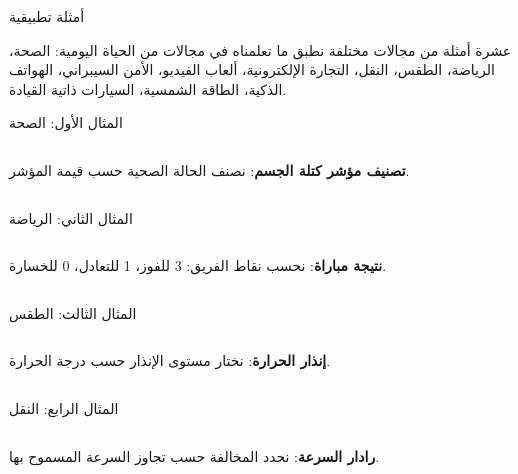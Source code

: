 \begin{frame}{أمثلة تطبيقية}
    \begin{tbox}{\faLaptopCode\quad عشرة أمثلة من مجالات مختلفة}
        نطبق ما تعلمناه في مجالات من الحياة اليومية:
        الصحة، الرياضة، الطقس، النقل، التجارة الإلكترونية، ألعاب الفيديو، الأمن السيبراني، الهواتف الذكية، الطاقة الشمسية، السيارات ذاتية القيادة.
    \end{tbox}
\end{frame}

\begin{frame}[t]{المثال الأول: الصحة}
    \begin{columns}[T]
        {\small\textbf{تصنيف مؤشر كتلة الجسم}: نصنف الحالة الصحية حسب قيمة المؤشر.\par}
        \vspace{0.3cm}
    \end{columns}
\end{frame}

\begin{frame}[t]{المثال الثاني: الرياضة}
    \begin{columns}[T]
        {\small\textbf{نتيجة مباراة}: نحسب نقاط الفريق: 3 للفوز، 1 للتعادل، 0 للخسارة.\par}
        \vspace{0.3cm}
    \end{columns}
\end{frame}

\begin{frame}[t]{المثال الثالث: الطقس}
    \begin{columns}[T]
        {\small\textbf{إنذار الحرارة}: نختار مستوى الإنذار حسب درجة الحرارة.\par}
        \vspace{0.3cm}
    \end{columns}
\end{frame}

\begin{frame}[t]{المثال الرابع: النقل}
    \begin{columns}[T]
        {\small\textbf{رادار السرعة}: نحدد المخالفة حسب تجاوز السرعة المسموح بها.\par}
        \vspace{0.3cm}
    \end{columns}
\end{frame}

